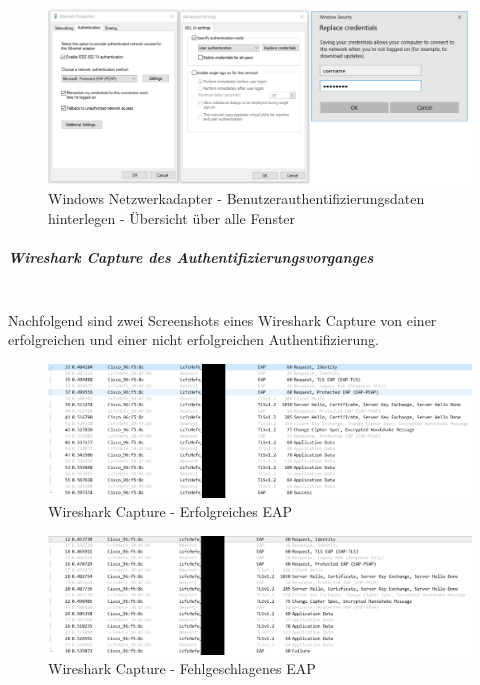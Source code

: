 \begin{figure}[H]
	\centering
	\includegraphics[width=15cm]{img/8021x/8021x_2.png}
	\caption{Windows Netzwerkadapter - Benutzerauthentifizierungsdaten hinterlegen - Übersicht über alle Fenster}
	\label{fig:windows-8021x-userauth}
\end{figure}

\subparagraph{Wireshark Capture des Authentifizierungsvorganges}
~\\
Nachfolgend sind zwei Screenshots eines Wireshark Capture von einer erfolgreichen und einer nicht erfolgreichen Authentifizierung. 

\begin{figure}[H]
	\centering
	\includegraphics[width=15cm]{img/8021x/userauth-success.png}
	\caption{Wireshark Capture - Erfolgreiches EAP}
	\label{fig:windows-8021x-userauth-success}
\end{figure}

\begin{figure}[H]
	\centering
	\includegraphics[width=15cm]{img/8021x/userauth-fail.png}
	\caption{Wireshark Capture - Fehlgeschlagenes EAP}
	\label{fig:windows-8021x-userauth-fail}
\end{figure}

